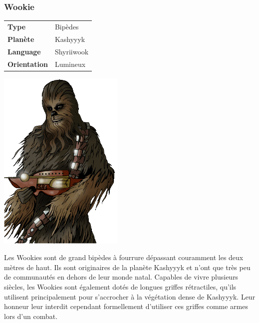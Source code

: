 \subsubsection{Wookie}
\begin{samepage}
	\begin{flushright}
		\begin{tabular}{ l l }
			\textbf{Type} 			& Bipèdes \\
		   	\textbf{Planète} 		& Kashyyyk \\
		   	\textbf{Language} 		& Shyriiwook \\
		   	\textbf{Orientation} 	& Lumineux \\
		\end{tabular}
	\end{flushright}
	\vspace{-6\baselineskip}
	\includegraphics[width=6cm]{img/personnages/races/wookie.png}
\end{samepage}

Les Wookies sont de grand bipèdes à fourrure dépassant couramment les deux mètres de haut. Ils sont originaires de la planète Kashyyyk et n'ont que très peu de communautés en dehors de leur monde natal. Capables de vivre plusieurs siècles, les Wookies sont également dotés de longues griffes rétractiles, qu'ils utilisent principalement pour s'accrocher à la végétation dense de Kashyyyk. Leur honneur leur interdit cependant formellement d'utiliser ces griffes comme armes lors d'un combat.

